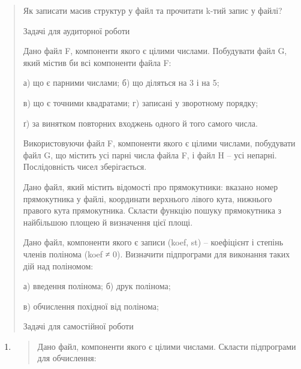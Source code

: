 \documentclass[]{article}
\begin{document}
\begin{quote}
Як записати масив структур у файл та прочитати k-тий запис у файлі?

Задачі для аудиторної роботи

Дано файл F, компоненти якого є цілими числами. Побудувати файл G, який
містив би всі компоненти файла F:

а) що є парними числами; б) що діляться на 3 і на 5;

в) що є точними квадратами; г) записані у зворотному порядку;

ґ) за винятком повторних входжень одного й того самого числа.

Використовуючи файл F, компоненти якого є цілими числами, побудувати
файл G, що містить усі парні числа файла F, і файл H -- усі непарні.
Послідовність чисел зберігається.

Дано файл, який містить відомості про прямокутники: вказано номер
прямокутника у файлі, координати верхнього лівого кута, нижнього правого
кута прямокутника. Скласти функцію пошуку прямокутника з найбільшою
площею й визначення цієї площі.

Дано файл, компоненти якого є записи (koef, st) -- коефіцієнт і степінь
членів полінома (koef ≠ 0). Визначити підпрограми для виконання таких
дій над поліномом:

а) введення полінома; б) друк полінома;

в) обчислення похідної від полінома;

Задачі для самостійної роботи
\end{quote}

\begin{enumerate}
\def\labelenumi{\arabic{enumi})}
\item
  \begin{quote}
  Дано файл, компоненти якого є цілими числами. Скласти підпрограми для
  обчислення:
  \end{quote}
\end{enumerate}
\end{document}
